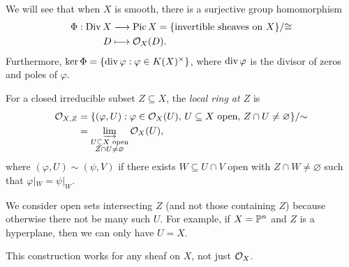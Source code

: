 \begin{remark}
  We will see that when $X$ is smooth,
  there is a surjective group homomorphism
  \begin{align*}
    \Phi : \operatorname{Div} X &\longrightarrow \operatorname{Pic} X
    = \{\text{invertible sheaves on } X\} / {\cong} \\
    D &\longmapsto \mathcal{O}_X(D).
  \end{align*}
  Furthermore, $\ker \Phi = \{\operatorname{div} \varphi : \varphi \in K(X)^\times\}$,
  where $\operatorname{div} \varphi$ is the divisor
  of zeros and poles of $\varphi$.
\end{remark}

\pagebreak

\begin{definition}
  For a closed irreducible subset
  $Z \subseteq X$, the
  \emph{local ring at $Z$} is
  \begin{align*}
    \mathcal{O}_{X, Z}
    &= \{
      (\varphi, U) : \varphi \in \mathcal{O}_X(U),\,
      U \subseteq X \text{ open},\,
      Z \cap U \ne \varnothing
    \} / {\sim} \\
    &= \varinjlim_{\substack{U \subseteq X \text{ open} \\ Z \cap U \ne \varnothing}} \mathcal{O}_X(U),
  \end{align*}
  where $(\varphi, U) \sim (\psi, V)$
  if there exists $W \subseteq U \cap V$
  open with $Z \cap W \ne \varnothing$
  such that $\varphi|_W = \psi|_W$.
\end{definition}

\begin{remark}
  We consider open sets intersecting
  $Z$ (and not those containing $Z$) because
  otherwise there not be many such $U$.
  For example, if $X = \mathbb{P}^n$ and
  $Z$ is a hyperplane, then we can only have
  $U = X$.
\end{remark}

\begin{remark}
  This construction
  works for any sheaf on $X$,
  not just $\mathcal{O}_X$.
\end{remark}
